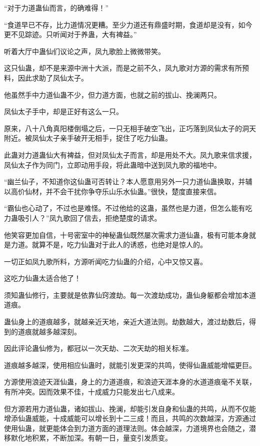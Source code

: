 \begin{this_body}
“对于力道蛊仙而言，的确难得！”

“食道早已不存，比力道情况更糟。至少力道还有鼎盛时期，食道却是没有，如今更不见踪迹。只听闻对于养蛊，大有裨益。”

听着大厅中蛊仙们议论之声，凤九歌脸上微微带笑。

这只仙蛊，却不是来源中洲十大派，而是之前不久，凤九歌对方源的需求有所预料，因此求助了凤仙太子。

他虽然手中力道仙蛊不少，但力道方面，也就之前的拔山、挽澜两只。

凤仙太子手中，却是正好有这么一只。

原来，八十八角真阳楼倒塌之后，一只无相手破空飞出，正巧落到凤仙太子的洞天附近。被凤仙太子亲手破开无相手，捉住了吃力仙蛊。

此蛊对力道蛊仙大有裨益，但对凤仙太子而言，却是用处不大。凤九歌来信求援，凤仙太子作为同门，立即动用手段，将此蛊暗中送到凤九歌的福地中。

“幽兰仙子，不知道你这仙蛊可否转让？本人愿意用另外一只力道仙蛊换取，并辅以高价仙材，并不会干扰你争夺乐山乐水仙蛊。”很快，楚度直接来信。

“霸仙也心动了，不过也是难怪。不过他给的这蛊，虽然也是力道，但怎么能有吃力蛊吸引人？”凤九歌回了信去，拒绝楚度的请求。

他笑容更加自信，十号密室中的神秘蛊仙既然屡次需求力道仙蛊，极有可能本身就是力道。就算不是，吃力仙蛊对于此人的诱惑，也绝对是惊人的。

一切正如凤九歌所料，方源听闻吃力仙蛊的介绍，心中又惊又喜。

这吃力仙蛊太适合他了！

须知蛊仙修行，主要就是依靠仙窍渡劫。每一次渡劫成功，蛊仙身躯都会增加本道道痕。

蛊仙身上的道痕越多，就越亲近天地，亲近大道法则。劫数越大，渡过劫数后，得到的道痕就越多越深刻。

因此评论蛊仙修为，都冠以一次天劫、二次天劫的相关标准。

道痕越多越深，使用相应仙蛊时，就能引发更深的共鸣，使得仙蛊威能增幅更巨。

方源使用浪迹天涯仙蛊，身上的力道道痕，和浪迹天涯本身的水道道痕毫不关联，有所冲突。因而效果不佳，十成威力只能发出七八成来。

但方源若用力道仙蛊，诸如拔山、挽澜，却能引发自身和仙蛊的共鸣，从而不仅能增添仙蛊威能，十成威能可以增长到十二三成！而且，共鸣的次数越深，方源通过使用仙蛊，就更能体会到力道方面的道理法则。体会越深，力道境界也会随之，潜移默化地积累，不断加深。有朝一日，量变引发质变。


\end{this_body}
